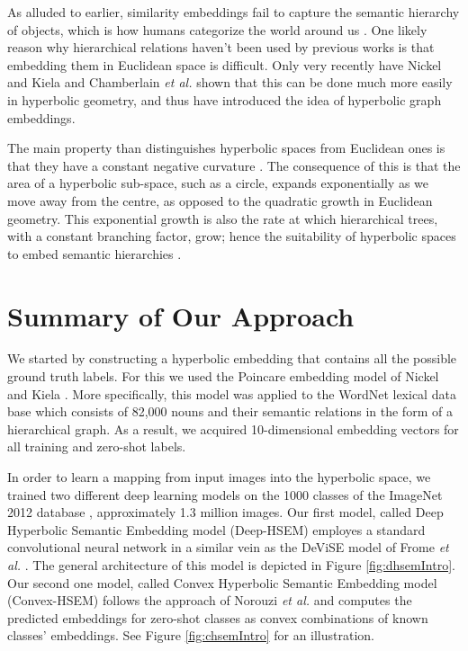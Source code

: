 \documentclass[12pt]{report}
\begin{document}
As alluded to earlier, similarity embeddings fail to capture the semantic hierarchy of objects, which is how humans categorize the world around us \cite{Rosch1976, Joliceur1984}. One likely reason why hierarchical relations haven't been used by previous works is that embedding them in Euclidean space is difficult. Only very recently have Nickel and Kiela \cite{Nickel2017} and Chamberlain \textit{et al.} \cite{Chamberlain2017} shown that this can be done much more easily in hyperbolic geometry, and thus have introduced the idea of hyperbolic graph embeddings.

The main property than distinguishes hyperbolic spaces from Euclidean ones is that they have a constant negative curvature \cite{Greenberg1994}. The consequence of this is that the area of a hyperbolic sub-space, such as a circle, expands exponentially as we move away from the centre, as opposed to the quadratic growth in Euclidean geometry. This exponential growth is also the rate at which hierarchical trees, with a constant branching factor, grow; hence the suitability of hyperbolic spaces to embed semantic hierarchies \cite{Nickel2017, Chamberlain2017}.

\section{Summary of Our Approach}
We started by constructing a hyperbolic embedding that contains all the possible ground truth labels. For this we used the Poincare embedding model of Nickel and Kiela \cite{Nickel2017}. More specifically, this model was applied to the WordNet lexical data base which consists of 82,000 nouns and their semantic relations in the form of a hierarchical graph. As a result, we acquired 10-dimensional embedding vectors for all training and zero-shot labels.

In order to learn a mapping from input images into the hyperbolic space, we trained two different deep learning models on the 1000 classes of the ImageNet 2012 database \cite{JiaDeng2009}, approximately 1.3 million images. Our first model, called Deep Hyperbolic Semantic Embedding model (Deep-HSEM) employes a standard convolutional neural network in a similar vein as the DeViSE model of Frome \textit{et al.} \cite{Frome2013}. The general architecture of this model is depicted in Figure \ref{fig:dhsemIntro}. Our second one model, called Convex Hyperbolic Semantic Embedding model (Convex-HSEM) follows the approach of Norouzi \textit{et al.} \cite{Norouzi2013} and computes the predicted embeddings for zero-shot classes as convex combinations of known classes' embeddings. See Figure \ref{fig:chsemIntro} for an illustration.
\end{document}
